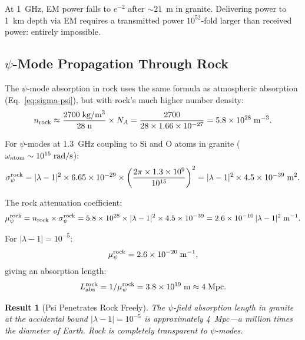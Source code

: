 \documentclass[aps,prd,twocolumn,superscriptaddress]{revtex4-2}
\newtheorem{result}{Result}
\begin{document}
At 1~GHz, EM power falls to $e^{-2}$ after $\sim 21$~m in granite.
Delivering power to 1~km depth via EM requires a transmitted power
$10^{52}$-fold larger than received power: entirely impossible.

\subsection{$\psi$-Mode Propagation Through Rock}

The $\psi$-mode absorption in rock uses the same formula as atmospheric
absorption (Eq.~\ref{eq:sigma-psi}), but with rock's much higher
number density:
\begin{equation}
n_{\rm rock} \approx \frac{2700\;\si{kg/m^3}}{28\;\si{u}}
\times N_A = \frac{2700}{28\times1.66\times10^{-27}}
= 5.8\times10^{28}\;\si{m^{-3}}.
\end{equation}

For $\psi$-modes at 1.3~GHz coupling to Si and O atoms in granite
($\omega_{\rm atom} \sim 10^{15}\;\si{rad/s}$):
\begin{equation}
\sigma_\psi^{\rm rock} = |\lambda-1|^2\times 6.65\times10^{-29}
\times\left(\frac{2\pi\times1.3\times10^9}{10^{15}}\right)^2
= |\lambda-1|^2\times 4.5\times10^{-39}\;\si{m^2}.
\end{equation}

The rock attenuation coefficient:
\begin{equation}
\mu_\psi^{\rm rock} = n_{\rm rock}\times\sigma_\psi^{\rm rock}
= 5.8\times10^{28}\times|\lambda-1|^2\times 4.5\times10^{-39}
= 2.6\times10^{-10}\,|\lambda-1|^2\;\si{m^{-1}}.
\label{eq:mu-rock}
\end{equation}

For $|\lambda-1| = 10^{-5}$:
\begin{equation}
\mu_\psi^{\rm rock} = 2.6\times10^{-20}\;\si{m^{-1}},
\end{equation}
giving an absorption length:
\begin{equation}
L_{\rm abs}^{\rm rock} = 1/\mu_\psi^{\rm rock}
= 3.8\times10^{19}\;\si{m} \approx 4\;\si{Mpc}.
\end{equation}

\begin{result}[Psi Penetrates Rock Freely]
The $\psi$-field absorption length in granite at the accidental bound
$|\lambda-1| = 10^{-5}$ is approximately 4~Mpc---a million times the
diameter of Earth.  Rock is completely transparent to $\psi$-modes.
\end{result}
\end{document}

